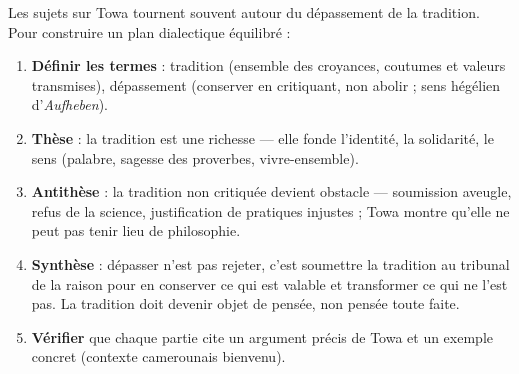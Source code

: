 \documentclass[11pt]{article}
\begin{document}
\begin{methode}
Les sujets sur Towa tournent souvent autour du dépassement de la tradition. Pour construire un plan dialectique équilibré :
\begin{enumerate}
\item \textbf{Définir les termes} : tradition (ensemble des croyances, coutumes et valeurs transmises), dépassement (conserver en critiquant, non abolir ; sens hégélien d'\emph{Aufheben}).
\item \textbf{Thèse} : la tradition est une richesse — elle fonde l'identité, la solidarité, le sens (palabre, sagesse des proverbes, vivre-ensemble).
\item \textbf{Antithèse} : la tradition non critiquée devient obstacle — soumission aveugle, refus de la science, justification de pratiques injustes ; Towa montre qu'elle ne peut pas tenir lieu de philosophie.
\item \textbf{Synthèse} : dépasser n'est pas rejeter, c'est soumettre la tradition au tribunal de la raison pour en conserver ce qui est valable et transformer ce qui ne l'est pas. La tradition doit devenir objet de pensée, non pensée toute faite.
\item \textbf{Vérifier} que chaque partie cite un argument précis de Towa et un exemple concret (contexte camerounais bienvenu).
\end{enumerate}
\end{methode}
\end{document}
